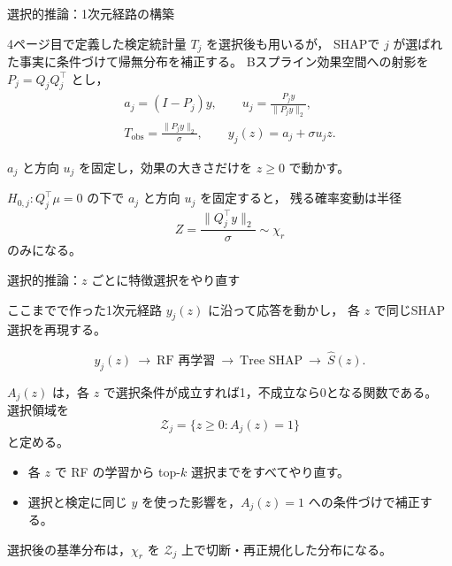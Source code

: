 \documentclass[aspectratio=169,11pt]{beamer}
\begin{document}
\begin{frame}{選択的推論：1次元経路の構築}
  \small

  4ページ目で定義した検定統計量 $T_j$ を選択後も用いるが，
  SHAPで $j$ が選ばれた事実に条件づけて帰無分布を補正する。
  Bスプライン効果空間への射影を $P_j=Q_jQ_j^\top$ とし，
  \[
    \begin{gathered}
      a_j=(I-P_j)y,\qquad
      u_j=\frac{P_jy}{\lVert P_jy\rVert_2},\\
      T_{\mathrm{obs}}=\frac{\lVert P_jy\rVert_2}{\sigma},\qquad
      y_j(z)=a_j+\sigma u_jz.
    \end{gathered}
  \]

  $a_j$ と方向 $u_j$ を固定し，効果の大きさだけを $z\ge0$ で動かす。

  \vspace{1em}

  $H_{0,j}:Q_j^\top\mu=0$ の下で $a_j$ と方向 $u_j$ を固定すると，
  残る確率変動は半径
  \[
    Z=\frac{\lVert Q_j^\top y\rVert_2}{\sigma}\sim\chi_r
  \]
  のみになる。
\end{frame}

\begin{frame}{選択的推論：$z$ ごとに特徴選択をやり直す}
  \small

  ここまでで作った1次元経路 $y_j(z)$ に沿って応答を動かし，
  各 $z$ で同じSHAP選択を再現する。

  \[
    y_j(z)
    \ \longrightarrow\ \text{RF 再学習}
    \ \longrightarrow\ \text{Tree SHAP}
    \ \longrightarrow\ \widehat S(z).
  \]

  $A_j(z)$ は，各 $z$ で選択条件が成立すれば1，不成立なら0となる関数である。
  選択領域を
  \[
    \mathcal Z_j=\{z\ge0:A_j(z)=1\}
  \]
  と定める。

  \begin{itemize}
    \item 各 $z$ で RF の学習から top-$k$ 選択までをすべてやり直す。
    \item 選択と検定に同じ $y$ を使った影響を，$A_j(z)=1$ への条件づけで補正する。
  \end{itemize}

  選択後の基準分布は，$\chi_r$ を $\mathcal Z_j$ 上で切断・再正規化した分布になる。
\end{frame}
\end{document}
